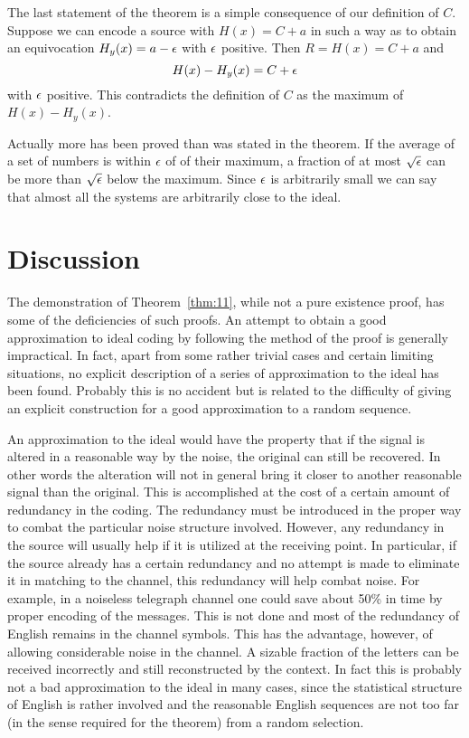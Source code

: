 The last statement of the theorem is a simple consequence of our
definition of $C$.  Suppose we can encode a source with $H(x) = C+ a$
in such a way as to obtain an equivocation $H_y(x) = a - \epsilon$ with
$\epsilon$ positive.  Then $R=H(x)=C+a$ and
$$
H(x) - H_y(x) = C+\epsilon
$$
with $\epsilon$ positive.  This contradicts the definition of $C$ as the
maximum of $H(x) - H_y(x)$.

Actually more has been proved than was stated in the theorem.  If the
average of a set of numbers is within $\epsilon$ of of their maximum, a
fraction of at most $\sqrt{\epsilon}$ can be more than $\sqrt{\epsilon}$ below
the maximum.  Since $\epsilon$ is arbitrarily small we can say that almost
all the systems are arbitrarily close to the ideal.

\section{Discussion}

The demonstration of Theorem~\ref{thm:11}, while not a pure existence
proof, has some of the deficiencies of such proofs.  An attempt to obtain
a good approximation to ideal coding by following the method of the proof
is generally impractical.  In fact, apart from some rather trivial cases
and certain limiting situations, no explicit description of  a series of
approximation to the ideal has been found.  Probably this is no accident
but is related to the difficulty of giving an explicit construction for
a good approximation to a random sequence.

An approximation to the ideal would have the property that if the
signal is altered in a reasonable way by the noise, the original can
still be recovered.  In other words the alteration will not in general
bring it closer to another reasonable signal than the original.  This is
accomplished at the cost of a certain amount of redundancy in the coding.
The redundancy must be introduced in the proper way to combat the
particular noise structure involved.  However, any redundancy in the
source will usually help if it is utilized at the receiving point.
In particular, if the source already has a certain redundancy and
no attempt is made to eliminate it in matching to the channel, this
redundancy will help combat noise.  For example, in a noiseless telegraph
channel one could save about 50\% in time by proper encoding of the
messages.  This is not done and most of the redundancy of English remains
in the channel symbols.  This has the advantage, however, of allowing
considerable noise in the channel.  A sizable fraction of the letters
can be received incorrectly and still reconstructed by the context.
In fact this is probably not a bad approximation to the ideal in many
cases, since the statistical structure of English is rather involved and
the reasonable English sequences are not too far (in the sense required
for the theorem) from a random selection.

